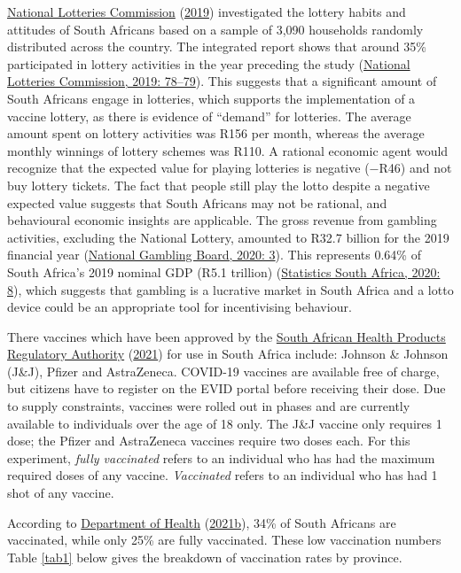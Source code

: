 \documentclass[11pt,preprint, authoryear]{elsarticle}
\numberwithin{equation}{section}
\numberwithin{figure}{section}
\numberwithin{table}{section}
\begin{document}
\protect\hyperlink{ref-lotto}{National Lotteries Commission}
(\protect\hyperlink{ref-lotto}{2019}) investigated the lottery habits
and attitudes of South Africans based on a sample of 3,090 households
randomly distributed across the country. The integrated report shows
that around 35\% participated in lottery activities in the year
preceding the study (\protect\hyperlink{ref-lotto}{National Lotteries
Commission, 2019: 78--79}). This suggests that a significant amount of
South Africans engage in lotteries, which supports the implementation of
a vaccine lottery, as there is evidence of ``demand'' for lotteries. The
average amount spent on lottery activities was R156 per month, whereas
the average monthly winnings of lottery schemes was R110. A rational
economic agent would recognize that the expected value for playing
lotteries is negative (\(-\)R46) and not buy lottery tickets. The fact
that people still play the lotto despite a negative expected value
suggests that South Africans may not be rational, and behavioural
economic insights are applicable. The gross revenue from gambling
activities, excluding the National Lottery, amounted to R32.7 billion
for the 2019 financial year (\protect\hyperlink{ref-gamble}{National
Gambling Board, 2020: 3}). This represents 0.64\% of South Africa's 2019
nominal GDP (R5.1 trillion) (\protect\hyperlink{ref-statsa}{Statistics
South Africa, 2020: 8}), which suggests that gambling is a lucrative
market in South Africa and a lotto device could be an appropriate tool
for incentivising behaviour.

There vaccines which have been approved by the
\protect\hyperlink{ref-sah}{South African Health Products Regulatory
Authority} (\protect\hyperlink{ref-sah}{2021}) for use in South Africa
include: Johnson \& Johnson (J\&J), Pfizer and AstraZeneca. COVID-19
vaccines are available free of charge, but citizens have to register on
the EVID portal before receiving their dose. Due to supply constraints,
vaccines were rolled out in phases and are currently available to
individuals over the age of 18 only. The J\&J vaccine only requires 1
dose; the Pfizer and AstraZeneca vaccines require two doses each. For
this experiment, \emph{fully vaccinated} refers to an individual who has
had the maximum required doses of any vaccine. \emph{Vaccinated} refers
to an individual who has had 1 shot of any vaccine.

According to \protect\hyperlink{ref-stat}{Department of Health}
(\protect\hyperlink{ref-stat}{2021b}), 34\% of South Africans are
vaccinated, while only 25\% are fully vaccinated. These low vaccination
numbers Table \ref{tab1} below gives the breakdown of vaccination rates
by province.
\end{document}
